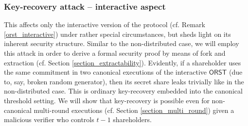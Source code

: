 \documentclass[10pt, psamsfonts, reqno]{amsart}
\theoremstyle{definition}
\theoremstyle{remark}
\numberwithin{equation}{section}
\begin{document}
\subsubsection{Key-recovery attack -- interactive aspect}\label{section_key_recovery_attack}
This affects only
the interactive version of the protocol
(cf. Remark \ref{orst_interactive})
under rather special circumstances,
but sheds light on its inherent security structure.
Similar to the non-distributed case,
we will employ this attack in order to derive
a formal security proof by means of fork and extraction
(cf. Section \ref{section_extractability}).
Evidently, if a shareholder uses the same commitment
in two canonical executions of the interactive $\mathsf{ORST}$
(due to, say, broken random generator),
then its secret share leaks trivially
like in the non-distributed case.
This is ordinary key-recovery
embedded into the canonical threshold setting.
We will show that key-recovery
is possible even for non-canonical multi-round executions
(cf. Section \ref{section_multi_round})
given a malicious verifier who controls $t-1$ shareholders.
\end{document}
